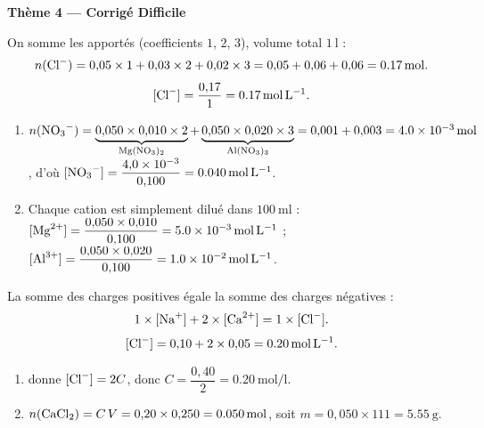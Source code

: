 \documentclass[11pt,a4paper]{article}
\begin{document}
\begin{center}{\large\bfseries\color{primarydark} Thème 4 — Corrigé Difficile}\end{center}

\begin{corrige}
On somme les  apportés (coefficients $1$, $2$, $3$), volume total $\SI{1}{\litre}$ :
\[ n(\ce{Cl-}) = 0{,}05\times 1 + 0{,}03\times 2 + 0{,}02\times 3 = 0{,}05 + 0{,}06 + 0{,}06 = \SI{0.17}{\mole}. \]
\[ [\ce{Cl-}] = \frac{0{,}17}{1} = \SI{0.17}{\mole\per\litre}. \]
\end{corrige}

\begin{corrige}
\begin{enumerate}[label=\alph*)]
  \item $n(\ce{NO3-}) = \underbrace{0{,}050\times 0{,}010\times 2}_{\ce{Mg(NO3)2}}
        + \underbrace{0{,}050\times 0{,}020\times 3}_{\ce{Al(NO3)3}} = 0{,}001 + 0{,}003 = \SI{4.0e-3}{\mole}$,
        d'où $[\ce{NO3-}] = \dfrac{4{,}0\times10^{-3}}{0{,}100} = \SI{0.040}{\mole\per\litre}$.
  \item Chaque cation est simplement dilué dans $\SI{100}{\milli\litre}$ :
        $[\ce{Mg^2+}] = \dfrac{0{,}050\times 0{,}010}{0{,}100} = \SI{5.0e-3}{\mole\per\litre}$ ;
        $[\ce{Al^3+}] = \dfrac{0{,}050\times 0{,}020}{0{,}100} = \SI{1.0e-2}{\mole\per\litre}$.
\end{enumerate}
\end{corrige}

\begin{corrige}[électroneutralité]
La somme des charges positives égale la somme des charges négatives :
\[ 1\times[\ce{Na+}] + 2\times[\ce{Ca^2+}] = 1\times[\ce{Cl-}]. \]
\[ [\ce{Cl-}] = 0{,}10 + 2\times 0{,}05 = \SI{0.20}{\mole\per\litre}. \]
\end{corrige}

\begin{corrige}
\begin{enumerate}[label=\alph*)]
  \item {} donne $[\ce{Cl-}] = 2C$, donc $C = \dfrac{0{,}40}{2} = \SI{0.20}{\mole\per\litre}$.
  \item $n(\ce{CaCl2}) = C\,V = 0{,}20\times 0{,}250 = \SI{0.050}{\mole}$, soit
        $m = 0{,}050\times 111 = \SI{5.55}{\gram}$.
\end{enumerate}
\end{corrige}
\end{document}
